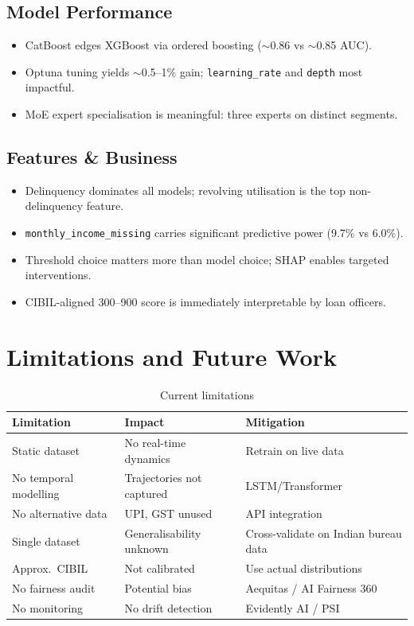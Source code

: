 \documentclass[11pt,a4paper]{article}
\begin{document}
\subsection{Model Performance}
\begin{itemize}
    \item CatBoost edges XGBoost via ordered boosting ($\sim$0.86 vs $\sim$0.85 AUC).
    \item Optuna tuning yields $\sim$0.5--1\% gain; \texttt{learning\_rate} and \texttt{depth} most impactful.
    \item MoE expert specialisation is meaningful: three experts on distinct segments.
\end{itemize}

\subsection{Features \& Business}
\begin{itemize}
    \item Delinquency dominates all models; revolving utilisation is the top non-delinquency feature.
    \item \texttt{monthly\_income\_missing} carries significant predictive power (9.7\% vs 6.0\%).
    \item Threshold choice matters more than model choice; SHAP enables targeted interventions.
    \item CIBIL-aligned 300--900 score is immediately interpretable by loan officers.
\end{itemize}


\section{Limitations and Future Work}

\begin{table}[H]
\centering\footnotesize
\caption{Current limitations}
\begin{tabular}{@{}p{2.5cm}p{4cm}p{4.5cm}@{}}
\toprule
\textbf{Limitation} & \textbf{Impact} & \textbf{Mitigation} \\
\midrule
Static dataset & No real-time dynamics & Retrain on live data \\
No temporal modelling & Trajectories not captured & LSTM/Transformer \\
No alternative data & UPI, GST unused & API integration \\
Single dataset & Generalisability unknown & Cross-validate on Indian bureau data \\
Approx.\ CIBIL & Not calibrated & Use actual distributions \\
No fairness audit & Potential bias & Aequitas / AI Fairness 360 \\
No monitoring & No drift detection & Evidently AI / PSI \\
\bottomrule
\end{tabular}
\end{table}
\end{document}
